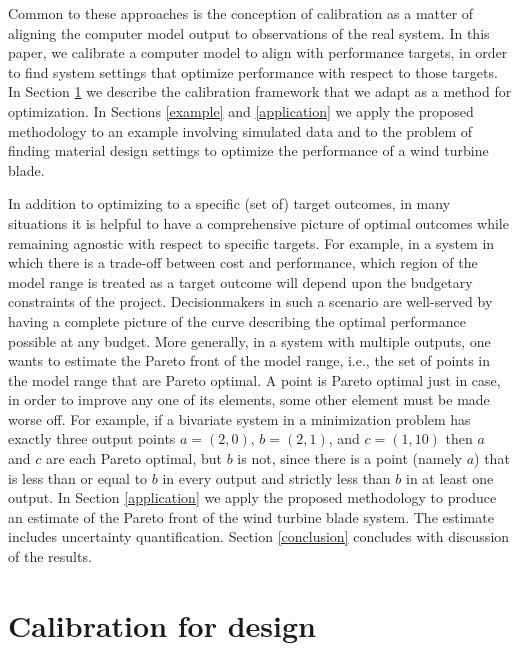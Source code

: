 \documentclass[12pt]{article}
\begin{document}
Common to these approaches is the conception of calibration as a matter of aligning the computer model output to observations of the real system. 
%
In this paper, we calibrate a computer model to align with performance targets, in order to find system settings that optimize performance with respect to those targets.
%
In Section \ref{calib_for_design} we describe the calibration framework that we adapt as a method for optimization. 
%
In Sections \ref{example} and \ref{application} we apply the proposed methodology to an example involving simulated data and to the problem of finding material design settings to optimize the performance of a wind turbine blade.
%

In addition to optimizing to a specific (set of) target outcomes, in many situations it is helpful to have a comprehensive picture of optimal outcomes while remaining agnostic with respect to specific targets.
%
For example, in a system in which there is a trade-off between cost and performance, which region of the model range is treated as a target outcome will depend upon the budgetary constraints of the project.
%
Decisionmakers in such a scenario are well-served by having a complete picture of the curve describing the optimal performance possible at any budget.
%
More generally, in a system with multiple outputs, one wants to estimate the Pareto front of the model range, i.e., the set of points in the model range that are Pareto optimal.
%
A point is Pareto optimal just in case, in order to improve any one of its elements, some other element must be made worse off.
%
For example, if a bivariate system in a minimization problem has exactly three output points $a=(2,0)$, $b=(2,1)$, and $c=(1,10)$ then $a$ and $c$ are each Pareto optimal, but $b$ is not, since there is a point (namely $a$) that is less than or equal to $b$ in every output and strictly less than $b$ in at least one output.
%
In Section \ref{application} we apply the proposed methodology to produce an estimate of the Pareto front of the wind turbine blade system.
%
The estimate includes uncertainty quantification.
%
Section \ref{conclusion} concludes with discussion of the results.

\section{Calibration for design}\label{calib_for_design}
\end{document}
